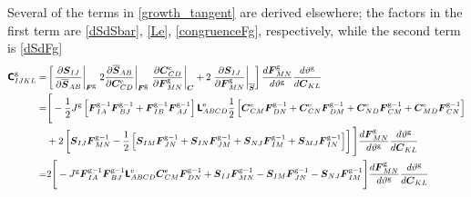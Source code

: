 \documentclass[10pt,letterpaper,oneside]{report}
\newcommand{\ten}[1]{\mbox{\boldmath $#1$}{}}
\newcommand{\tenf}[1]{\mbox{{\sffamily{\bfseries {#1}}}}}
\newcommand{\scas}[1]{\mbox{{\scriptsize{${\rm{#1}}$}}}{}}
\newcommand{\tens}[1]{\mbox{\boldmath{\scriptsize{$#1$}}}{}}
\begin{document}
Several of the terms in \autoref{growth_tangent} are derived elsewhere; the factors in the first term are \autoref{dSdSbar}, \autoref{Le}, \autoref{congruenceFg}, respectively, while the second term is \autoref{dSdFg}
\begin{align}
\tenf{C}^{\scas{g}}_{IJKL} =& \left[ \left. \frac{\partial \ten{S}_{IJ} }{\partial \overline{\ten{S}}_{AB} } \right|_{\tens{F}^{\scas{g}}} \left. 2 \frac{\partial \overline{\ten{S}}_{AB} }{\partial \ten{C}^{\scas{e}}_{CD} } \right|_{\tens{F}^{\scas{g}}} \left. \frac{\partial \ten{C}^{\scas{e}}_{CD} }{\partial \ten{F}^{\scas{g}}_{MN} } \right|_{\tens{C}} 
+ 2 \left. \frac{\partial \ten{S}_{IJ} }{\partial \ten{F}^{\scas{g}}_{MN} } \right|_{\overline{\tens{S}}} \right] \frac{d \ten{F}^{\scas{g}}_{MN} }{d \vartheta^{\scas{g}}} \frac{ d \vartheta^{\scas{g}} }{ d \ten{C}_{KL} } 
\notag \\
=& \Bigg[ - \frac{1}{2} J^{\scas{g}} \left[ \ten{F}^{\scas{g}-1}_{IA} \ten{F}^{\scas{g}-1}_{BJ} + \ten{F}^{\scas{g}-1}_{IB} \ten{F}^{\scas{g}-1}_{AJ} \right] \tenf{L}^{\scas{e}}_{ABCD} \frac{1}{2} \left[ \ten{C}^{\scas{e}}_{CM} \ten{F}^{\scas{g}-1}_{DN} + \ten{C}^{\scas{e}}_{CN} \ten{F}^{\scas{g}-1}_{DM} + \ten{C}^{\scas{e}}_{ND} \ten{F}^{\scas{g}-1}_{CM} + \ten{C}^{\scas{e}}_{MD} \ten{F}^{\scas{g}-1}_{CN} \right]
\notag \\ 
&+ 2 \left[ \ten{S}_{IJ} \ten{F}^{\scas{g}-1}_{MN} - \frac{1}{2} \left[ \ten{S}_{IM} \ten{F}^{\scas{g}-1}_{JN} + \ten{S}_{IN} \ten{F}^{\scas{g}-1}_{JM} + \ten{S}_{NJ} \ten{F}^{\scas{g}-1}_{IM} + \ten{S}_{MJ} \ten{F}^{\scas{g}-1}_{IN} \right]  \right] \Bigg] \frac{d \ten{F}^{\scas{g}}_{MN} }{d \vartheta^{\scas{g}}} \frac{ d \vartheta^{\scas{g}} }{ d \ten{C}_{KL} } 
\notag \\
=& 2 \Bigg[ - J^{\scas{g}}  \ten{F}^{\scas{g}-1}_{IA} \ten{F}^{\scas{g}-1}_{BJ} \tenf{L}^{\scas{e}}_{ABCD} \ten{C}^{\scas{e}}_{CM} \ten{F}^{\scas{g}-1}_{DN}
+ \ten{S}_{IJ} \ten{F}^{\scas{g}-1}_{MN} - \ten{S}_{IM} \ten{F}^{\scas{g}-1}_{JN} - \ten{S}_{NJ} \ten{F}^{\scas{g}-1}_{IM} \Bigg] \frac{d \ten{F}^{\scas{g}}_{MN} }{d \vartheta^{\scas{g}}} \frac{ d \vartheta^{\scas{g}} }{ d \ten{C}_{KL} } 
\end{align}
\end{document}
